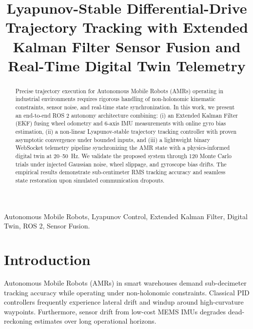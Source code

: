 \documentclass[conference]{IEEEtran}
\begin{document}
\title{Lyapunov-Stable Differential-Drive Trajectory Tracking with Extended Kalman Filter Sensor Fusion and Real-Time Digital Twin Telemetry}

\author{
}

\maketitle

\begin{abstract}
Precise trajectory execution for Autonomous Mobile Robots (AMRs) operating in industrial environments requires rigorous handling of non-holonomic kinematic constraints, sensor noise, and real-time state synchronization. In this work, we present an end-to-end ROS 2 autonomy architecture combining: (i) an Extended Kalman Filter (EKF) fusing wheel odometry and 6-axis IMU measurements with online gyro bias estimation, (ii) a non-linear Lyapunov-stable trajectory tracking controller with proven asymptotic convergence under bounded inputs, and (iii) a lightweight binary WebSocket telemetry pipeline synchronizing the AMR state with a physics-informed digital twin at 20--50~Hz. We validate the proposed system through 120 Monte Carlo trials under injected Gaussian noise, wheel slippage, and gyroscope bias drifts. The empirical results demonstrate sub-centimeter RMS tracking accuracy and seamless state restoration upon simulated communication dropouts.
\end{abstract}

\begin{IEEEkeywords}
Autonomous Mobile Robots, Lyapunov Control, Extended Kalman Filter, Digital Twin, ROS 2, Sensor Fusion.
\end{IEEEkeywords}

\section{Introduction}
Autonomous Mobile Robots (AMRs) in smart warehouses demand sub-decimeter tracking accuracy while operating under non-holonomic constraints. Classical PID controllers frequently experience lateral drift and windup around high-curvature waypoints. Furthermore, sensor drift from low-cost MEMS IMUs degrades dead-reckoning estimates over long operational horizons.
\end{document}
